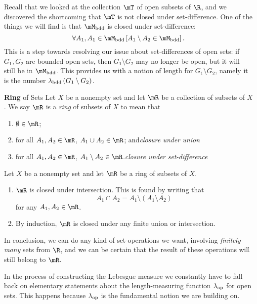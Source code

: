 \documentclass[pmath450]{subfiles}
\begin{document}
    Recall that we looked at the collection $\mT$ of open subsets of $\R$, and we discovered the shortcoming that $\mT$ is not closed under set-difference. One of the things we will find is that $\mM_{\bdd}$ is closed under set-difference:
    \begin{equation*}
        \forall A_1,A_1\in\mM_{\bdd}\left[ A_1\setminus A_2\in\mM_{\bdd} \right].
    \end{equation*}
    This is a step towards resolving our issue about set-differences of open sets: if $G_1,G_2$ are bounded open sets, then $G_1\setminus G_2$ may no longer be open, but it will still be in $\mM_{\bdd}$. This provides us with a notion of length for $G_1\setminus G_2$, namely it is the number $\lambda_{\operatorname{bdd}}\left( G_1\setminus G_2 \right)$.

    \begin{definition}{\textbf{Ring} of Sets}
        Let $X$ be a nonempty set and let $\mR$ be a collection of subsets of $X$. We say $\mR$ is a \emph{ring} of subsets of $X$ to mean that
        \begin{enumerate}
            \item $\emptyset\in\mR$;
            \item for all $A_1,A_2\in\mR$, $A_1\cup A_2\in\mR$; and\hfill\textit{closure under union}
            \item for all $A_1,A_2\in\mR$, $A_1\setminus A_2\in\mR$.\hfill\textit{closure under set-difference}
        \end{enumerate}
    \end{definition}

    Let $X$ be a nonempty set and let $\mR$ be a ring of subsets of $X$.
    \begin{enumerate}
        \item $\mR$ is closed under intersection. This is found by writing that
            \begin{equation*}
                A_1\cap A_2 = A_1\setminus \left( A_1\setminus A_2 \right)
            \end{equation*}
            for any $A_1,A_2\in\mR$.
        \item By induction, $\mR$ is closed under any finite union or intersection.
    \end{enumerate}
    In conclusion, we can do any kind of set-operations we want, involving \textit{finitely many} sets from $\R$, and we can be certain that the result of these operations will still belong to $\mR$.

    \np In the process of constructing the Lebesgue measure we constantly have to fall back on elementary statements about the length-measuring function $\lambda_{\operatorname{op}}$ for open sets. This happens because $\lambda_{\operatorname{op}}$ is the fundamental notion we are building on.
\end{document}
